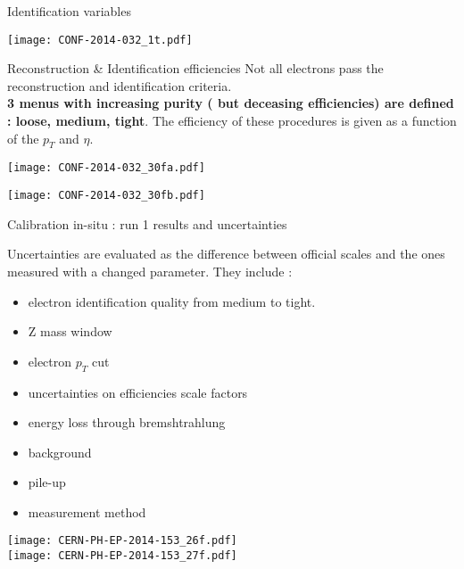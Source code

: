 \begin{frame}{Identification variables}
  \begin{center}
\texttt{[image: CONF-2014-032\_1t.pdf]}
\end{center}
\end{frame}

\begin{frame}{Reconstruction \& Identification efficiencies}
  Not all electrons pass the reconstruction and identification criteria. \\
  {\bf 3 menus with increasing purity ( but deceasing efficiencies) are defined : loose, medium, tight}.
  The efficiency of these procedures is given as a function of the $p_T$ and $\eta$.\\
\begin{minipage}{0.49\linewidth}
  \texttt{[image: CONF-2014-032\_30fa.pdf]}
\end{minipage}
\begin{minipage}{0.49\linewidth}
  \texttt{[image: CONF-2014-032\_30fb.pdf]}
\end{minipage}
\end{frame}


\begin{frame}{Calibration in-situ : run 1  results and uncertainties}
\begin{minipage}{0.64\linewidth}
  Uncertainties are evaluated as the difference between official scales and the ones measured with a changed parameter. 
  They include :
  \begin{itemize}
  \item electron identification quality from medium to tight.
  \item Z mass window 
  \item electron $p_T$ cut
  \item uncertainties on efficiencies scale factors
  \item energy loss through bremshtrahlung
  \item background
  \item pile-up
  \item measurement method
  \end{itemize}
\end{minipage}
\begin{minipage}{0.35\linewidth}
    \texttt{[image: CERN-PH-EP-2014-153\_26f.pdf]}\\
    \texttt{[image: CERN-PH-EP-2014-153\_27f.pdf]}
\end{minipage}
\end{frame}
